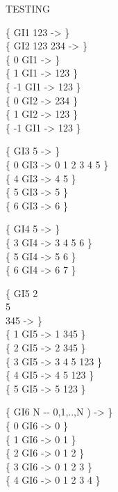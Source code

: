 \begin{tt}
TESTING        

\{ \word{:} GI1  123  \word{;} -> \} \\
\{ \word{:} GI2  123  234  \word{;} -> \} \\
\{  0 GI1 ->     \} \\
\{  1 GI1 -> 123 \} \\
\{ -1 GI1 -> 123 \} \\
\{  0 GI2 -> 234 \} \\
\{  1 GI2 -> 123 \} \\
\{ -1 GI1 -> 123 \}

\{ \word{:} GI3   5      \word{;} -> \} \\
\{ 0 GI3 -> 0 1 2 3 4 5 \} \\
\{ 4 GI3 -> 4 5 \} \\
\{ 5 GI3 -> 5 \} \\
\{ 6 GI3 -> 6 \}

\{ \word{:} GI4     5   \word{;} -> \} \\
\{ 3 GI4 -> 3 4 5 6 \} \\
\{ 5 GI4 -> 5 6 \} \\
\{ 6 GI4 -> 6 7 \}

\{ \word{:} GI5   2   \\
\tab {} 5      \\
  345  \word{;} -> \} \\
\{ 1 GI5 -> 1 345 \} \\
\{ 2 GI5 -> 2 345 \} \\
\{ 3 GI5 -> 3 4 5 123 \} \\
\{ 4 GI5 -> 4 5 123 \} \\
\{ 5 GI5 -> 5 123 \}

\{ \word{:} GI6  N -{}- 0,1,..,N )  
	    
	 \word{;} -> \} \\
\{ 0 GI6 -> 0 \} \\
\{ 1 GI6 -> 0 1 \} \\
\{ 2 GI6 -> 0 1 2 \} \\
\{ 3 GI6 -> 0 1 2 3 \} \\
\{ 4 GI6 -> 0 1 2 3 4 \}
\end{tt}


